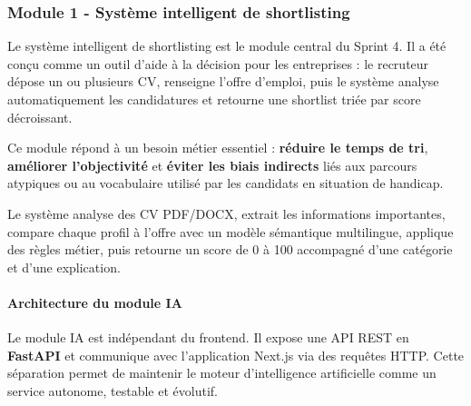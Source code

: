\documentclass[12pt,a4paper]{report}
\begin{document}
\subsubsection{Module 1 - Système intelligent de shortlisting}

Le système intelligent de shortlisting est le module central du Sprint 4. Il a été conçu comme un outil d'aide à la décision pour les entreprises : le recruteur dépose un ou plusieurs CV, renseigne l'offre d'emploi, puis le système analyse automatiquement les candidatures et retourne une shortlist triée par score décroissant.

Ce module répond à un besoin métier essentiel : \textbf{réduire le temps de tri}, \textbf{améliorer l'objectivité} et \textbf{éviter les biais indirects} liés aux parcours atypiques ou au vocabulaire utilisé par les candidats en situation de handicap.

\begin{infobox}
Le système analyse des CV PDF/DOCX, extrait les informations importantes, compare chaque profil à l'offre avec un modèle sémantique multilingue, applique des règles métier, puis retourne un score de 0 à 100 accompagné d'une catégorie et d'une explication.
\end{infobox}

\paragraph{Architecture du module IA}

Le module IA est indépendant du frontend. Il expose une API REST en \textbf{FastAPI} et communique avec l'application Next.js via des requêtes HTTP. Cette séparation permet de maintenir le moteur d'intelligence artificielle comme un service autonome, testable et évolutif.
\end{document}
